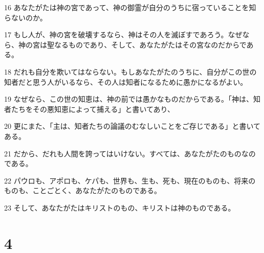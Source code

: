 \par 16 あなたがたは神の宮であって、神の御霊が自分のうちに宿っていることを知らないのか。
\par 17 もし人が、神の宮を破壊するなら、神はその人を滅ぼすであろう。なぜなら、神の宮は聖なるものであり、そして、あなたがたはその宮なのだからである。
\par 18 だれも自分を欺いてはならない。もしあなたがたのうちに、自分がこの世の知者だと思う人がいるなら、その人は知者になるために愚かになるがよい。
\par 19 なぜなら、この世の知恵は、神の前では愚かなものだからである。「神は、知者たちをその悪知恵によって捕える」と書いてあり、
\par 20 更にまた、「主は、知者たちの論議のむなしいことをご存じである」と書いてある。
\par 21 だから、だれも人間を誇ってはいけない。すべては、あなたがたのものなのである。
\par 22 パウロも、アポロも、ケパも、世界も、生も、死も、現在のものも、将来のものも、ことごとく、あなたがたのものである。
\par 23 そして、あなたがたはキリストのもの、キリストは神のものである。

\chapter{4}


